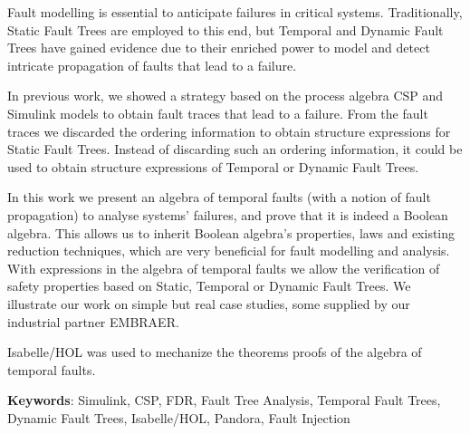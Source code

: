 \documentclass[12pt,openright,twoside,a4paper,oldfontcommands,english,brazil,final]{abntex2}
\renewcommand{\listfigurename}{List of figures}
\renewcommand{\listtablename}{List of tables}
\theoremstyle{theo}
\begin{document}

\begin{resumo}
Fault modelling is essential to anticipate failures in critical systems.
Traditionally, Static Fault Trees are employed to this end, but Temporal and Dynamic Fault Trees have gained evidence due to their enriched power to model and detect intricate propagation of faults that lead to a failure.

In previous work, we showed a strategy based on the process algebra CSP and Simulink models to obtain fault traces that lead to a failure.
From the fault traces we discarded the ordering information to obtain structure expressions for Static Fault Trees.
Instead of discarding such an ordering information, it could be used to obtain structure expressions of Temporal or Dynamic Fault Trees.

In this work we present an algebra of temporal faults (with a notion of fault propagation) to analyse systems' failures, and prove that it is indeed a Boolean algebra.
This allows us to inherit Boolean algebra's properties, laws and existing reduction techniques, which are very beneficial for fault modelling and analysis.
With expressions in the algebra of temporal faults we allow the verification of safety properties based on Static, Temporal or Dynamic Fault Trees.
We illustrate our work on simple but real case studies, some supplied by our industrial partner EMBRAER.

Isabelle/HOL was used to mechanize the theorems proofs of the algebra of temporal faults.

\vspace{\onelineskip}
\noindent
{}
\textbf{Keywords}: Simulink, CSP, FDR, Fault Tree Analysis, Temporal Fault Trees, Dynamic Fault Trees, Isabelle/HOL, Pandora, Fault Injection
\end{resumo}

\pdfbookmark[0]{\listfigurename}{lof}
\listoffigures*
\cleardoublepage

\pdfbookmark[0]{\listtablename}{lot}
\listoftables*
\cleardoublepage

%
\end{document}

